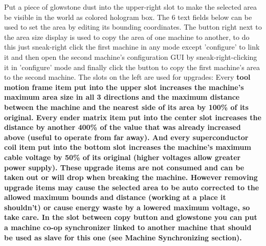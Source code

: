 \documentclass[11pt]{article} %
\begin{document}
Put a piece of glowstone dust into the upper-right slot to make the selected area be visible in the world as colored hologram box. The 6 text fields below can be used to set the area by editing its bounding coordinates. The button right next to the area size display is used to copy the area of one machine to another, to do this just sneak-right click the first machine in any mode except 'configure' to link it and then open the second machine's configuration GUI by sneak-right-clicking it in 'configure' mode and finally click the button to copy the first machine's area to the second machine. The slots on the left are used for upgrades: Every \bf tool motion frame \rm item put into the upper slot increases the machine's maximum area size in all 3 directions and the maximum distance between the machine and the nearest side of its area by 100\% of its original. Every \bf ender matrix \rm item put into the center slot increases the distance by another 400\% of the value that was already increased above (useful to operate from far away). And every \bf superconductor coil \rm item put into the bottom slot increases the machine's maximum cable voltage by 50\% of its original (higher voltages allow greater power supply). These upgrade items are not consumed and can be taken out or will drop when breaking the machine. However removing upgrade items may cause the selected area to be auto corrected to the allowed maximum bounds and distance (working at a place it shouldn't) or cause energy waste by a lowered maximum voltage, so take care. In the slot between copy button and glowstone you can put a \bf machine co-op synchronizer \rm linked to another machine that should be used as slave for this one (see Machine Synchronizing section).
\end{document}
